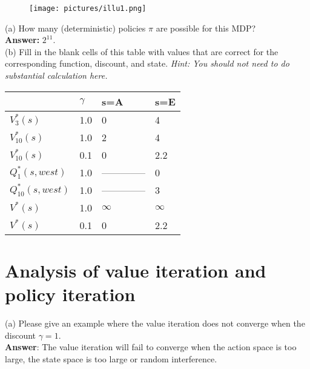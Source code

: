 \documentclass{article}
\begin{document}
\begin{figure}[h]
\centering
\texttt{[image: pictures/illu1.png]}
\end{figure}


\noindent (a) How many (deterministic) policies $\pi$ are possible for this MDP?\\

\textbf{Answer:} $2^{11}$. \\


\noindent (b) Fill in the blank cells of this table with values that are correct for the corresponding function, discount, and state. \textit{Hint: You should not need to do substantial calculation here.}


\renewcommand\arraystretch{1.5}
\begin{table}[tbh!]
\begin{center}
    \begin{tabular}{|p{2cm}| p{2cm}| p{2cm} | p{2cm}|}
\hline 
  & $\gamma$ & s=A & s=E  \\
\hline
$V_3^*(s)$ & 1.0  & 0  & 4  \\
\hline
$V_{10}^*(s)$ & 1.0  &  2 & 4  \\
\hline 
$V_{10}^*(s)$ & 0.1  & 0  & 2.2  \\
\hline
$Q_{1}^*(s,west)$ & 1.0  &  --------------  & 0  \\
\hline
$Q_{10}^*(s,west)$ & 1.0 &  --------------  &  3 \\
\hline
$V^*(s)$ & 1.0  & $\infty$ & $\infty$  \\
\hline 
$V^*(s)$ & 0.1  & 0  &  2.2 \\
\hline
\end{tabular}
\end{center}
\end{table}


\newpage
\section{Analysis of value iteration and policy iteration}

\noindent (a) Please give an example where the value iteration does not converge when the discount $\gamma=1$.\\

\textbf{Answer}: The value iteration will fail to converge when the action space is too large, the state space is too large or random interference.

~\\
\end{document}
